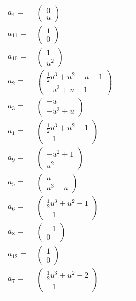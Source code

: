 \documentclass[1p]{elsarticle_modified}
\theoremstyle{definition}
\begin{document}
\begin{tabular}{m{7pt} m{180pt} m{7pt} m{180pt} }
\flushright $a_{4}=$&$\begin{pmatrix}0\\u\end{pmatrix}$ \\
\flushright $a_{11}=$&$\begin{pmatrix}1\\0\end{pmatrix}$ \\
\flushright $a_{10}=$&$\begin{pmatrix}1\\u^2\end{pmatrix}$ \\
\flushright $a_{2}=$&$\begin{pmatrix}\frac{1}{2} u^3+u^2- u-1\\- u^3+u-1\end{pmatrix}$ \\
\flushright $a_{3}=$&$\begin{pmatrix}- u\\- u^3+u\end{pmatrix}$ \\
\flushright $a_{1}=$&$\begin{pmatrix}\frac{1}{2} u^3+u^2-1\\-1\end{pmatrix}$ \\
\flushright $a_{9}=$&$\begin{pmatrix}- u^2+1\\u^2\end{pmatrix}$ \\
\flushright $a_{5}=$&$\begin{pmatrix}u\\u^3- u\end{pmatrix}$ \\
\flushright $a_{6}=$&$\begin{pmatrix}\frac{1}{2} u^3+u^2-1\\-1\end{pmatrix}$ \\
\flushright $a_{8}=$&$\begin{pmatrix}-1\\0\end{pmatrix}$ \\
\flushright $a_{12}=$&$\begin{pmatrix}1\\0\end{pmatrix}$ \\
\flushright $a_{7}=$&$\begin{pmatrix}\frac{1}{2} u^3+u^2-2\\-1\end{pmatrix}$\\&\end{tabular}
\end{document}
